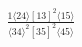 \documentclass[varwidth, border=5pt]{standalone}
\begin{document}
\begin{my}
$\begin{gathered}
\scriptscriptstyle\frac{1⟨24⟩[13]^2⟨15⟩}{⟨34⟩^2[35]^2⟨45⟩}
\end{gathered}$
\end{my}
\end{document}
